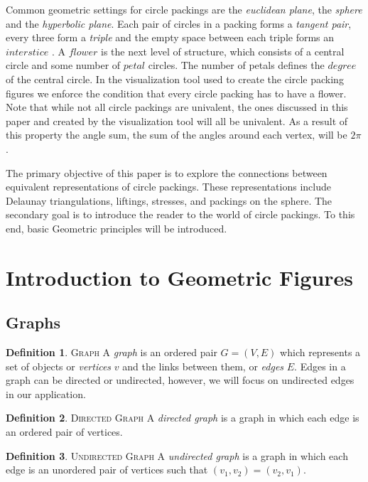 \documentclass[11pt]{article}
\theoremstyle{definition}
\newtheorem{definition}{Definition}[section]
\begin{document}
	Common geometric settings for circle packings are the \emph{euclidean plane}, the \emph{sphere} and the \emph{hyperbolic plane}. 
	Each pair of circles in a packing forms a \emph{tangent pair}, every three form a \emph{triple} and the empty space between each triple forms an $interstice$ \cite{stephenson05introduction}. 
	A $flower$ is the next level of structure, which consists of a central circle and some number of $petal$ circles. 
	The number of petals defines the $degree$ of the central circle. 
	In the visualization tool used to create the circle packing figures we enforce the condition that every circle packing has to have a flower. 
	Note that while not all circle packings are univalent, the ones discussed in this paper and created by the visualization tool will all be univalent. 
	As a result of this property the angle sum, the sum of the angles around each vertex, will be $2\pi$.

	The primary objective of this paper is to explore the connections between equivalent representations of circle packings. 
	These representations include Delaunay triangulations, liftings, stresses, and packings on the sphere. 
	The secondary goal is to introduce the reader to the world of circle packings. To this end, basic Geometric principles will be introduced.

\section{Introduction to Geometric Figures}
\subsection{Graphs}
	\theoremstyle{definition}
	\begin{definition}{\textsc{Graph}}
		A \emph{graph} is an ordered pair $G=(V,E)$ which represents a set of objects or \emph{vertices} $v$ and the links between them, or \emph{edges} $E$. 
		Edges in a graph can be directed or undirected, however, we will focus on undirected edges in our application. 
	\end{definition}
	
	\theoremstyle{definition}
	\begin{definition}{\textsc{Directed Graph}}
  		A \emph{directed graph} is a graph in which each edge is an ordered pair of vertices.
	\end{definition}
	
	\theoremstyle{definition}
	\begin{definition}{\textsc{Undirected Graph}}
  		A \emph{undirected graph} is a graph in which each edge is an unordered pair of vertices such that $(v_1, v_2) = (v_2, v_1)$.
  	\end{definition}
	
\end{document}

